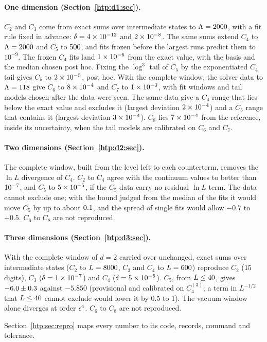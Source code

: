 \paragraph{One dimension (Section~\ref{htp:d1:sec}).} $C_2$ and $C_3$ come from exact sums over intermediate states to
$\Lambda=2000$, with a fit rule fixed in advance: $\delta=4\times10^{-12}$ and $2\times10^{-8}$. The same
sums extend $C_4$ to $\Lambda=2000$ and $C_5$ to $500$, and fits frozen before the largest runs
predict them to $10^{-9}$. The frozen $C_4$ fits land $1\times10^{-6}$ from the exact value, with the basis and the
median chosen post hoc. Fixing the $\log^3$ tail of $C_5$ by the exponentiated $C_4$ tail gives $C_5$ to
$2\times10^{-5}$, post hoc. With the complete window, the solver data to $\Lambda=118$ give $C_6$ to
$8\times10^{-4}$ and $C_7$ to $1\times10^{-3}$, with fit windows and tail models chosen after the data were seen. The
same data give a $C_4$ range that lies below the exact value and excludes it (largest deviation
$2\times10^{-4}$) and a $C_5$ range that contains it (largest deviation $3\times10^{-4}$). $C_8$ lies $7\times10^{-4}$ from the reference, inside its
uncertainty, when the tail models are calibrated on $C_6$ and $C_7$.

\paragraph{Two dimensions (Section~\ref{htp:d2:sec}).} The complete window, built from the level left to each counterterm,
removes the $\ln L$ divergence of $C_4$. $C_2$ to $C_4$ agree with the continuum values to better than
$10^{-7}$, and $C_5$ to $5\times10^{-5}$, if the $C_5$ data carry no residual $\ln L$ term. The data cannot exclude one; with
the bound judged from the median of the fits it would move $C_5$ by up to about $0.1$, and the spread of
single fits would allow $-0.7$ to $+0.5$. $C_6$ to $C_8$ are not reproduced.

\paragraph{Three dimensions (Section~\ref{htp:d3:sec}).} With the complete window of $d=2$ carried over unchanged, exact sums
over intermediate states ($C_2$ to $L=8000$, $C_3$ and $C_4$ to $L=600$) reproduce $C_2$
($15$ digits), $C_3$ ($\delta=1\times10^{-7}$) and $C_4$ ($\delta=5\times10^{-6}$). $C_5$, from
$L\le40$, gives $-6.0\pm0.3$ against $-5.850$ (provisional and calibrated on $C_4^{(3)}$; a term in
$L^{-1/2}$ that $L\le40$ cannot exclude would lower it by 0.5 to 1). The vacuum window alone diverges at
order $\epsilon^4$. $C_6$ to $C_8$ are not reproduced.

Section~\ref{htp:sec:repro} maps every number to its code, records, command and tolerance.
